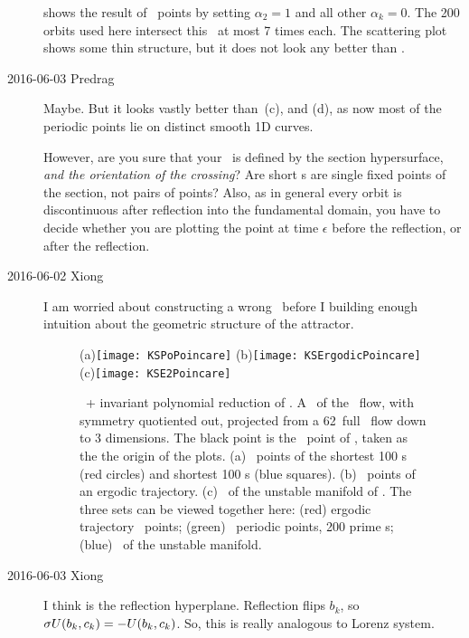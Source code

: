 \begin{description}
 shows the
result of \PoincSec\ points by setting $\alpha_2 = 1$ and
all other $\alpha_k=0$. The 200 orbits used here intersect this
\PoincSec\ at most 7 times each. The scattering plot shows some thin
structure, but it does not look any better than
.

\item[2016-06-03 Predrag]
Maybe. But it looks vastly better than \,(c), and
(d), as now most of the periodic points lie on distinct smooth 1D curves.

However, are you sure that your \PoincSec\ is defined by the section
hypersurface, \emph{and the orientation of the crossing}? Are short \po s
are single fixed points of the section, not pairs of points? Also, as in
general every orbit is discontinuous after reflection into the
fundamental domain, you have to decide whether you are plotting the point
at time $\epsilon$ before the reflection, or after the reflection.

\item[2016-06-02 Xiong] I am worried about constructing a wrong
\PoincSec\ before I building enough intuition about the geometric
structure of the attractor.
\begin{figure} %
  \centering
  (a)\texttt{[image: KSPoPoincare]}
  (b)\texttt{[image: KSErgodicPoincare]}
  (c)\texttt{[image: KSE2Poincare]}
  \caption{
    \SFslice\ + invariant polynomial  reduction of .
    A \PoincSec\ of the \KS\ flow, with  symmetry quotiented out,
    projected from a 62\dmn\ full \statesp\ flow down to 3 dimensions.
    The black point is the \PoincSec\ point
    of , taken as the the origin of the plots.
    (a) \PoincSec\ points of the shortest 100 \rpo s (red circles)
    and shortest 100 \ppo s (blue squares).
    (b) \PoincSec\ points of an ergodic trajectory.
    (c) \PoincSec\ of the unstable manifold of .
    The three sets can be viewed together
    {here}:
      (red) ergodic trajectory \PoincSec\ points;
      (green) \PoincSec\ periodic points, 200 prime \po s;
      (blue)  \PoincSec\ of the  unstable manifold.
  }
  \label{fig:ksfundPoinc}
\end{figure}

\item[2016-06-03 Xiong]
I think  is the reflection hyperplane. Reflection
flips $b_k$, so $\sigma U(b_k, c_k)= -U(b_k, c_k)$. So, this is really analogous
to Lorenz system.


\end{description}

